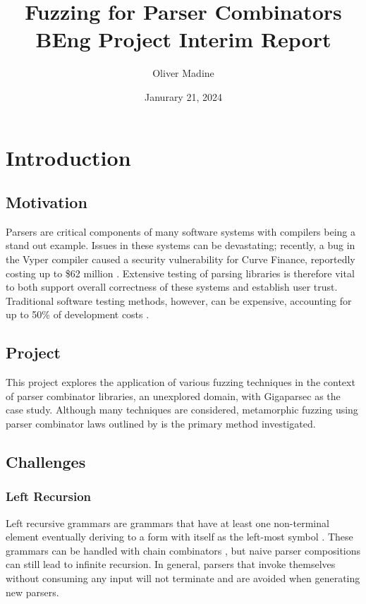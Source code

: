 \documentclass{article}
\title{Fuzzing for Parser Combinators \\ {\large BEng Project Interim Report}}
\author{Oliver Madine}
\date{Janurary 21, 2024}
\let\oldciteauthor\citeauthor
\renewcommand{\citeauthor}[1]{\oldciteauthor{#1} \cite{#1}}
\begin{document}
\maketitle

\section{Introduction} %


\subsection{Motivation}
Parsers are critical components of many software systems with compilers being a stand out example. Issues in these systems can be devastating; recently, a bug in the Vyper compiler caused a security vulnerability for Curve Finance, reportedly costing up to \$62 million \cite{curve}. Extensive testing of parsing libraries is therefore vital to both support overall correctness of these systems and establish user trust. Traditional software testing methods, however, can be expensive, accounting for up to 50\% of development costs \cite{quickcheck}.

\subsection{Project}
This project explores the application of various fuzzing techniques in the context of parser combinator libraries, an unexplored domain, with Gigaparsec \cite{Gigaparsec} as the case study. Although many techniques are considered, metamorphic fuzzing \cite{metamorphic} using parser combinator laws outlined by \citeauthor{parsley} is the primary method investigated.

\subsection{Challenges}


\subsubsection{Left Recursion}
Left recursive grammars are grammars that have at least one non-terminal element eventually deriving to a form with itself as the left-most symbol \cite{left-recursive}. These grammars can be handled with chain combinators \cite{design-patterns}, but naive parser compositions can still lead to infinite recursion. In general, parsers that invoke themselves without consuming any input will not terminate and are avoided when generating new parsers.
\end{document}
